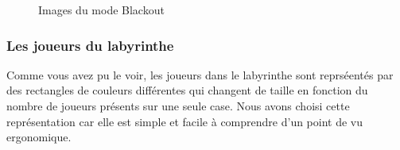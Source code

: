 \begin{figure}[!htb]
    \qquad

    \caption{Images du mode Blackout}%
\end{figure}

\subsubsection*{Les joueurs du labyrinthe}

Comme vous avez pu le voir, les joueurs dans le labyrinthe sont reprséentés par des rectangles de couleurs différentes qui changent de taille en fonction du nombre de joueurs présents sur une seule case. Nous avons choisi cette représentation car elle est simple et facile à comprendre d'un point de vu ergonomique.

